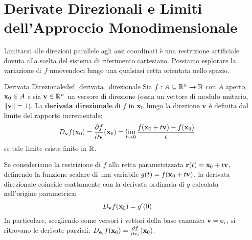 \section{Derivate Direzionali e Limiti dell'Approccio Monodimensionale}

Limitarsi alle direzioni parallele agli assi coordinati è una restrizione artificiale dovuta alla scelta del sistema di riferimento cartesiano. Possiamo esplorare la variazione di $f$ muovendoci lungo una qualsiasi retta orientata nello spazio.

\begin{definizione}{Derivata Direzionale}{def_derivata_direzionale}
Sia $f: A \subseteq \mathbb{R}^n \to \mathbb{R}$ con $A$ aperto, $\mathbf{x}_0 \in A$ e sia $\mathbf{v} \in \mathbb{R}^n$ un versore di direzione (ossia un vettore di modulo unitario, $\lVert\mathbf{v}\rVert = 1$). La \textbf{derivata direzionale} di $f$ in $\mathbf{x}_0$ lungo la direzione $\mathbf{v}$ è definita dal limite del rapporto incrementale:
\[
D_{\mathbf{v}} f(\mathbf{x}_0) = \frac{\partial f}{\partial \mathbf{v}}(\mathbf{x}_0) = \lim_{t \to 0} \frac{f(\mathbf{x}_0 + t\mathbf{v}) - f(\mathbf{x}_0)}{t}
\]
se tale limite esiste finito in $\mathbb{R}$.
\end{definizione}

Se consideriamo la restrizione di $f$ alla retta parametrizzata $\mathbf{r}(t) = \mathbf{x}_0 + t\mathbf{v}$, definendo la funzione scalare di una variabile $g(t) = f(\mathbf{x}_0 + t\mathbf{v})$, la derivata direzionale coincide esattamente con la derivata ordinaria di $g$ calcolata nell'origine parametrica:
\[
D_{\mathbf{v}} f(\mathbf{x}_0) = g'(0)
\]
In particolare, scegliendo come versori i vettori della base canonica $\mathbf{v} = \mathbf{e}_i$, si ritrovano le derivate parziali: $D_{\mathbf{e}_i} f(\mathbf{x}_0) = \frac{\partial f}{\partial x_i}(\mathbf{x}_0)$.

\begin{center}
\end{center}

